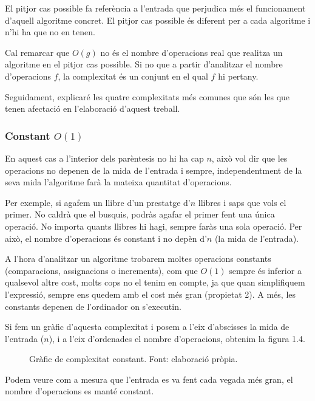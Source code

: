 El pitjor cas possible fa referència a l'entrada que perjudica més el funcionament d'aquell algoritme concret. El pitjor cas possible és diferent per a cada algoritme i n'hi ha que no en tenen.

Cal remarcar que $O(g)$ no és el nombre d'operacions real que realitza un algoritme en el pitjor cas possible. Si no que a partir d'analitzar el nombre d'operacions $f$, la complexitat és un conjunt en el qual $f$ hi pertany.

Seguidament, explicaré les quatre complexitats més comunes que són les que tenen afectació en l'elaboració d'aquest treball.

\subsubsection*{Constant $O(1)$}
En aquest cas a l'interior dels parèntesis no hi ha cap $n$, això vol dir que les operacions no depenen de la mida de l'entrada i sempre, independentment de la seva mida l'algoritme farà la mateixa quantitat d'operacions.

Per exemple, si agafem un llibre d'un prestatge d'$n$ llibres i saps que vols el primer. No caldrà que el busquis, podràs agafar el primer fent una única operació. No importa quants llibres hi hagi, sempre faràs una sola operació. Per això, el nombre d'operacions és constant i no depèn d'$n$ (la mida de l'entrada).

A l'hora d'analitzar un algoritme trobarem moltes operacions constants (comparacions, assignacions o increments), com que $O(1)$ sempre és inferior a qualsevol altre cost, molts cops no el tenim en compte, ja que quan simplifiquem l'expressió, sempre ens quedem amb el cost més gran (propietat 2). A més, les constants depenen de l'ordinador on s'executin.

Si fem un gràfic d'aquesta complexitat i posem a l'eix d'abscisses la mida de l'entrada ($n$), i a l'eix d'ordenades el nombre d'operacions, obtenim la figura 1.4.
\begin{figure}[H]
    \centering
    \caption[Gràfic de complexitat constant.]{Gràfic de complexitat constant. Font: elaboració pròpia.}\label{fig:my_label}
\end{figure}
\vspace{-18pt}
Podem veure com a mesura que l'entrada es va fent cada vegada més gran, el nombre d'operacions es manté constant.


